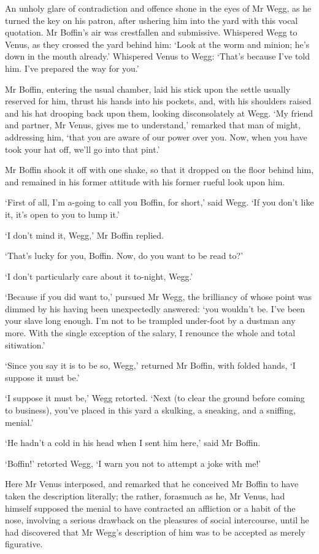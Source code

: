 An unholy glare of contradiction and offence shone in the eyes of Mr
Wegg, as he turned the key on his patron, after ushering him into the
yard with this vocal quotation. Mr Boffin’s air was crestfallen and
submissive. Whispered Wegg to Venus, as they crossed the yard behind
him: ‘Look at the worm and minion; he’s down in the mouth already.’
Whispered Venus to Wegg: ‘That’s because I’ve told him. I’ve prepared
the way for you.’

Mr Boffin, entering the usual chamber, laid his stick upon the settle
usually reserved for him, thrust his hands into his pockets, and,
with his shoulders raised and his hat drooping back upon them, looking
disconsolately at Wegg. ‘My friend and partner, Mr Venus, gives me to
understand,’ remarked that man of might, addressing him, ‘that you are
aware of our power over you. Now, when you have took your hat off, we’ll
go into that pint.’

Mr Boffin shook it off with one shake, so that it dropped on the floor
behind him, and remained in his former attitude with his former rueful
look upon him.

‘First of all, I’m a-going to call you Boffin, for short,’ said Wegg.
‘If you don’t like it, it’s open to you to lump it.’

‘I don’t mind it, Wegg,’ Mr Boffin replied.

‘That’s lucky for you, Boffin. Now, do you want to be read to?’

‘I don’t particularly care about it to-night, Wegg.’

‘Because if you did want to,’ pursued Mr Wegg, the brilliancy of whose
point was dimmed by his having been unexpectedly answered: ‘you wouldn’t
be. I’ve been your slave long enough. I’m not to be trampled under-foot
by a dustman any more. With the single exception of the salary, I
renounce the whole and total sitiwation.’

‘Since you say it is to be so, Wegg,’ returned Mr Boffin, with folded
hands, ‘I suppose it must be.’

‘I suppose it must be,’ Wegg retorted. ‘Next (to clear the ground before
coming to business), you’ve placed in this yard a skulking, a sneaking,
and a sniffing, menial.’

‘He hadn’t a cold in his head when I sent him here,’ said Mr Boffin.

‘Boffin!’ retorted Wegg, ‘I warn you not to attempt a joke with me!’

Here Mr Venus interposed, and remarked that he conceived Mr Boffin to
have taken the description literally; the rather, forasmuch as he, Mr
Venus, had himself supposed the menial to have contracted an affliction
or a habit of the nose, involving a serious drawback on the pleasures of
social intercourse, until he had discovered that Mr Wegg’s description
of him was to be accepted as merely figurative.

